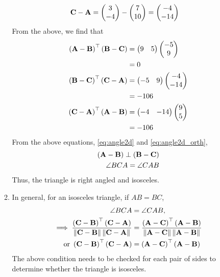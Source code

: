 \documentclass[journal,12pt,twocolumn]{IEEEtran}
\renewcommand\thesection{\arabic{section}}
\begin{document}
\begin{enumerate}[label=\thesection.\arabic*.,ref=\thesection.\theenumi]
\begin{enumerate}
\begin{align}
			\\
			\mathbf{C} -\mathbf{A}&= \begin{pmatrix}3 \\ -4\end{pmatrix} -\begin{pmatrix}7 \\ 10\end{pmatrix} = \begin{pmatrix}-4 \\ -14\end{pmatrix}
		\end{align}
		From the above,  we find that 
		\begin{align}
			\left(\mathbf{A} -\mathbf{B}\right)^{\top}\left(\mathbf{B} -\mathbf{C}\right)&=  \begin{pmatrix}9 & 5\end{pmatrix}\begin{pmatrix}-5 \\ 9\end{pmatrix}
			\\
			&=0
			\\
			\left(\mathbf{B} -\mathbf{C}\right)^{\top}\left(\mathbf{C} -\mathbf{A}\right)&=  \begin{pmatrix}-5 & 9\end{pmatrix}\begin{pmatrix}-4 \\ -14\end{pmatrix}
\\
			&=-106
			\\
			\left(\mathbf{C} -\mathbf{A}\right)^{\top}\left(\mathbf{A} -\mathbf{B}\right)&=  \begin{pmatrix}-4 & -14\end{pmatrix}\begin{pmatrix}9 \\ 5\end{pmatrix}
\\
			&=-106
		\end{align}
		From  the above equations, 
    \eqref{eq:angle2d} and 
    \eqref{eq:angle2d_orth},
		\begin{align}
			\left(\mathbf{A} -\mathbf{B}\right)\perp \left(\mathbf{B} -\mathbf{C}\right)
			\\
			\angle BCA = 
			\angle CAB  
		\end{align}
		Thus, the triangle is right angled and isosceles.
	\item In general,  for an isosceles triangle, if $AB = BC$,
		\begin{align}
			\angle BCA &= 
			\angle CAB,  
			\\
			\implies \frac{\left(\mathbf{C}-\mathbf{B}\right)^{\top}\left(\mathbf{C}-\mathbf{A}\right)}{\left\lVert\mathbf{C}-\mathbf{B}\right\rVert\left\lVert\mathbf{C}-\mathbf{A}\right\rVert}
			&=\frac{\left(\mathbf{A}-\mathbf{C}\right)^{\top}\left(\mathbf{A}-\mathbf{B}\right)}{\left\lVert\mathbf{A}-\mathbf{C}\right\rVert\left\lVert\mathbf{A}-\mathbf{B}\right\rVert}
			\\
			\text{or }\left(\mathbf{C}-\mathbf{B}\right)^{\top}\left(\mathbf{C}-\mathbf{A}\right) &= \left(\mathbf{A}-\mathbf{C}\right)^{\top}\left(\mathbf{A}-\mathbf{B}\right)
		\end{align}
		The above condition needs to be checked for each pair of sides to determine whether the triangle is isosceles.
		\end{enumerate}
\end{enumerate}
\end{document}
